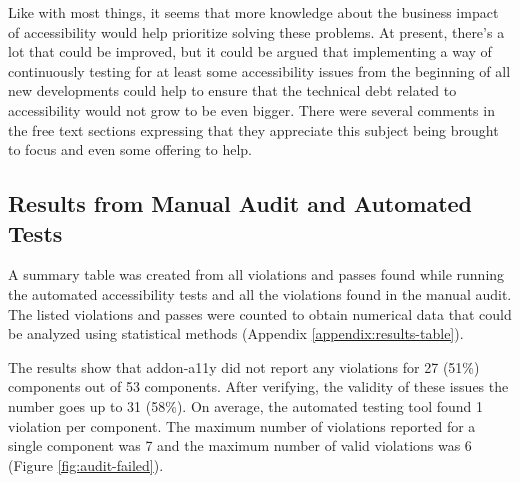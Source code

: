 \documentclass{master_thesis}
\begin{document}
Like with most things, it seems that more knowledge about the business impact of accessibility would help prioritize solving these problems. At present, there's a lot that could be improved, but it could be argued that implementing a way of continuously testing for at least some accessibility issues from the beginning of all new developments could help to ensure that the technical debt related to accessibility would not grow to be even bigger. There were several comments in the free text sections expressing that they appreciate this subject being brought to focus and even some offering to help.

\subsection{Results from Manual Audit and Automated Tests}

A summary table was created from all violations and passes found while running the automated accessibility tests and all the violations found in the manual audit. The listed violations and passes were counted to obtain numerical data that could be analyzed using statistical methods (Appendix \ref{appendix:results-table}).

The results show that addon-a11y did not report any violations for 27 (51\%) components out of 53 components. After verifying, the validity of these issues the number goes up to 31 (58\%). On average, the automated testing tool found 1 violation per component. The maximum number of violations reported for a single component was 7 and the maximum number of valid violations was 6 (Figure \ref{fig:audit-failed}).

\end{document}
